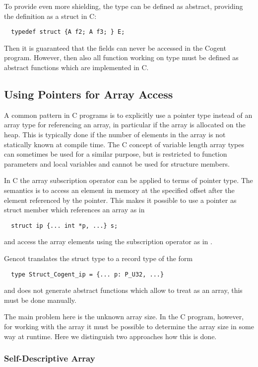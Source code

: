 To provide even more shielding, the type  can be defined as abstract, providing the definition
as a struct in C:
\begin{verbatim}
  typedef struct {A f2; A f3; } E;
\end{verbatim}
Then it is guaranteed that the fields can never be accessed in the Cogent program. However, then also 
all function working on type  must be defined as abstract functions which are implemented in C.

\subsection{Using Pointers for Array Access}
\label{app-transtype-arrpoint}

A common pattern in C programs is to explicitly use a pointer type instead of an array type for referencing an array,
in particular if the array is allocated on the heap. This is typically done if the number of elements in the
array is not statically known at compile time. The C concept of variable length array types can sometimes be
used for a similar purpose, but is restricted to function parameters and local variables and cannot be used for
structure members.

In C the array subscription operator can be applied to terms of pointer type. The semantics is to access an element 
in memory at the specified offset after the element referenced by the pointer. This makes it possible to use 
a pointer as struct member which references an array as in
\begin{verbatim}
  struct ip {... int *p, ...} s;
\end{verbatim}
and access the array elements using the subscription operator as in .

Gencot translates the struct type to a record type of the form
\begin{verbatim}
  type Struct_Cogent_ip = {... p: P_U32, ...}
\end{verbatim}
and does not generate abstract functions which allow to treat  as an array, this must be done manually.

The main problem here is the unknown array size. In the C program, however, for working with the array it must be
possible to determine the array size in some way at runtime. Here we distinguish two approaches how this is done.

\subsubsection{Self-Descriptive Array}

